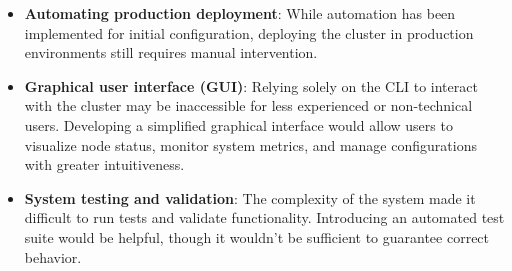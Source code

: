 \begin{itemize}
  \item \textbf{Automating production deployment}: While automation has been implemented 
    for initial configuration, deploying the cluster in production environments 
    still requires manual intervention.

  \item \textbf{Graphical user interface (GUI)}: Relying solely on the CLI to interact 
    with the cluster may be inaccessible for less experienced or non-technical users. 
    Developing a simplified graphical interface would allow users to visualize node 
    status, monitor system metrics, and manage configurations with greater intuitiveness.

  \item \textbf{System testing and validation}: The complexity of the system made it
    difficult to run tests and validate functionality. Introducing an automated test 
    suite would be helpful, though it wouldn't be sufficient to guarantee correct behavior.
\end{itemize}

